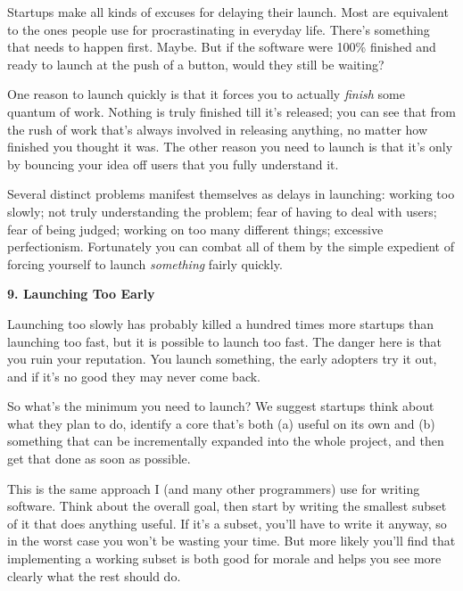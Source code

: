 Startups make all kinds of excuses for delaying
                    their launch. Most are equivalent to the ones people use for
                    procrastinating in everyday life. There's something that
                    needs to happen first. Maybe. But if the software were 100\%
                    finished and ready to launch at the push of a button, would
                    they still be waiting?

One reason to launch
                    quickly is that it forces you to actually \emph{finish} some
                    quantum of work. Nothing is truly finished till it's
                    released; you can see that from the rush of work that's
                    always involved in releasing anything, no matter how
                    finished you thought it was. The other reason you need to
                    launch is that it's only by bouncing your idea off users
                    that you fully understand it.

Several distinct
                    problems manifest themselves as delays in launching: working
                    too slowly; not truly understanding the problem; fear of
                    having to deal with users; fear of being judged; working on
                    too many different things; excessive perfectionism.
                    Fortunately you can combat all of them by the simple
                    expedient of forcing yourself to launch
                    \emph{something} fairly quickly.

\textbf{9. Launching Too Early}

Launching too slowly has probably killed a
                    hundred times more startups than launching too fast, but it
                    is possible to launch too fast. The danger here is that you
                    ruin your reputation. You launch something, the early
                    adopters try it out, and if it's no good they may never come
                    back.

So what's the minimum you need to launch?
                    We suggest startups think about what they plan to do,
                    identify a core that's both (a) useful on its own and (b)
                    something that can be incrementally expanded into the whole
                    project, and then get that done as soon as possible.

This
                    is the same approach I (and many other programmers) use for
                    writing software. Think about the overall goal, then start
                    by writing the smallest subset of it that does anything
                    useful. If it's a subset, you'll have to write it anyway, so
                    in the worst case you won't be wasting your time. But more
                    likely you'll find that implementing a working subset is
                    both good for morale and helps you see more clearly what the
                    rest should do.

